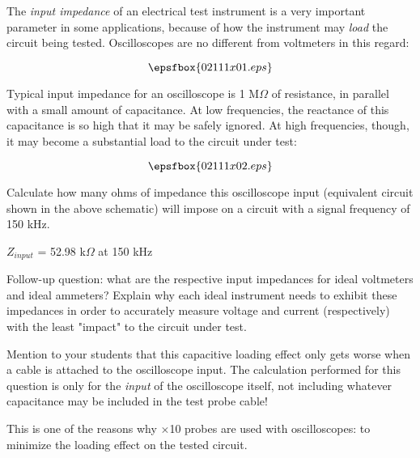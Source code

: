 

The {\it input impedance} of an electrical test instrument is a very important parameter in some applications, because of how the instrument may {\it load} the circuit being tested.  Oscilloscopes are no different from voltmeters in this regard:

$$\epsfbox{02111x01.eps}$$

Typical input impedance for an oscilloscope is 1 M$\Omega$ of resistance, in parallel with a small amount of capacitance.  At low frequencies, the reactance of this capacitance is so high that it may be safely ignored.  At high frequencies, though, it may become a substantial load to the circuit under test:

$$\epsfbox{02111x02.eps}$$

Calculate how many ohms of impedance this oscilloscope input (equivalent circuit shown in the above schematic) will impose on a circuit with a signal frequency of 150 kHz.







$Z_{input}$ = 52.98 k$\Omega$ at 150 kHz

\vskip 10pt

Follow-up question: what are the respective input impedances for ideal voltmeters and ideal ammeters?  Explain why each ideal instrument needs to exhibit these impedances in order to accurately measure voltage and current (respectively) with the least "impact" to the circuit under test.







Mention to your students that this capacitive loading effect only gets worse when a cable is attached to the oscilloscope input.  The calculation performed for this question is only for the {\it input} of the oscilloscope itself, not including whatever capacitance may be included in the test probe cable!

This is one of the reasons why $\times$10 probes are used with oscilloscopes: to minimize the loading effect on the tested circuit.





